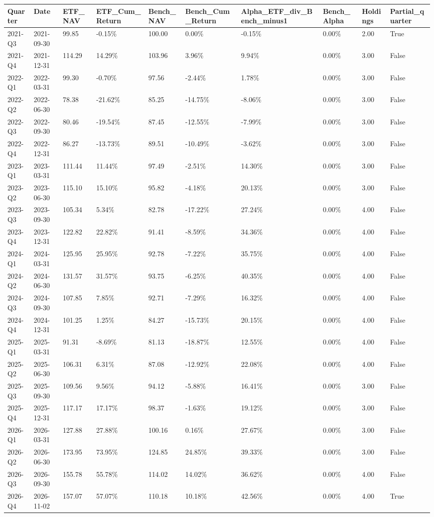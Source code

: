 \begin{longtable}{llllllllll}
Quarter & Date & ETF\_NAV & ETF\_Cum\_Return & Bench\_NAV & Bench\_Cum\_Return & Alpha\_ETF\_div\_Bench\_minus1 & Bench\_Alpha & Holdings & Partial\_quarter \\
\hline
2021-Q3 & 2021-09-30 & 99.85 & -0.15\% & 100.00 & 0.00\% & -0.15\% & 0.00\% & 2.00 & True \\
2021-Q4 & 2021-12-31 & 114.29 & 14.29\% & 103.96 & 3.96\% & 9.94\% & 0.00\% & 3.00 & False \\
2022-Q1 & 2022-03-31 & 99.30 & -0.70\% & 97.56 & -2.44\% & 1.78\% & 0.00\% & 3.00 & False \\
2022-Q2 & 2022-06-30 & 78.38 & -21.62\% & 85.25 & -14.75\% & -8.06\% & 0.00\% & 3.00 & False \\
2022-Q3 & 2022-09-30 & 80.46 & -19.54\% & 87.45 & -12.55\% & -7.99\% & 0.00\% & 3.00 & False \\
2022-Q4 & 2022-12-31 & 86.27 & -13.73\% & 89.51 & -10.49\% & -3.62\% & 0.00\% & 3.00 & False \\
2023-Q1 & 2023-03-31 & 111.44 & 11.44\% & 97.49 & -2.51\% & 14.30\% & 0.00\% & 3.00 & False \\
2023-Q2 & 2023-06-30 & 115.10 & 15.10\% & 95.82 & -4.18\% & 20.13\% & 0.00\% & 3.00 & False \\
2023-Q3 & 2023-09-30 & 105.34 & 5.34\% & 82.78 & -17.22\% & 27.24\% & 0.00\% & 4.00 & False \\
2023-Q4 & 2023-12-31 & 122.82 & 22.82\% & 91.41 & -8.59\% & 34.36\% & 0.00\% & 4.00 & False \\
2024-Q1 & 2024-03-31 & 125.95 & 25.95\% & 92.78 & -7.22\% & 35.75\% & 0.00\% & 4.00 & False \\
2024-Q2 & 2024-06-30 & 131.57 & 31.57\% & 93.75 & -6.25\% & 40.35\% & 0.00\% & 4.00 & False \\
2024-Q3 & 2024-09-30 & 107.85 & 7.85\% & 92.71 & -7.29\% & 16.32\% & 0.00\% & 4.00 & False \\
2024-Q4 & 2024-12-31 & 101.25 & 1.25\% & 84.27 & -15.73\% & 20.15\% & 0.00\% & 4.00 & False \\
2025-Q1 & 2025-03-31 & 91.31 & -8.69\% & 81.13 & -18.87\% & 12.55\% & 0.00\% & 4.00 & False \\
2025-Q2 & 2025-06-30 & 106.31 & 6.31\% & 87.08 & -12.92\% & 22.08\% & 0.00\% & 4.00 & False \\
2025-Q3 & 2025-09-30 & 109.56 & 9.56\% & 94.12 & -5.88\% & 16.41\% & 0.00\% & 3.00 & False \\
2025-Q4 & 2025-12-31 & 117.17 & 17.17\% & 98.37 & -1.63\% & 19.12\% & 0.00\% & 3.00 & False \\
2026-Q1 & 2026-03-31 & 127.88 & 27.88\% & 100.16 & 0.16\% & 27.67\% & 0.00\% & 3.00 & False \\
2026-Q2 & 2026-06-30 & 173.95 & 73.95\% & 124.85 & 24.85\% & 39.33\% & 0.00\% & 3.00 & False \\
2026-Q3 & 2026-09-30 & 155.78 & 55.78\% & 114.02 & 14.02\% & 36.62\% & 0.00\% & 4.00 & False \\
2026-Q4 & 2026-11-02 & 157.07 & 57.07\% & 110.18 & 10.18\% & 42.56\% & 0.00\% & 4.00 & True \\
\end{longtable}
